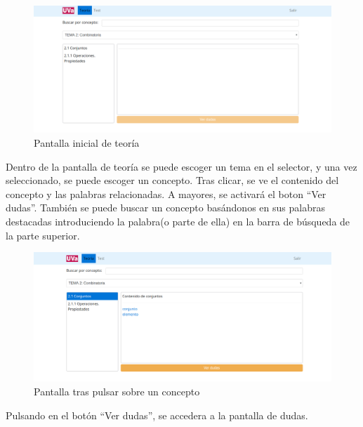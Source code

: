 \documentclass[openright,twoside,10pt]{book}
\begin{document}
    \begin{figure}[H]
        \begin{center}
            \includegraphics[width=\textwidth]{img/manual/alumno-teoria.png}
        \end{center}
        \caption{Pantalla inicial de teoría}
    \end{figure}
    
    Dentro de la pantalla de teoría se puede escoger un tema en el selector,
    y una vez seleccionado, se puede escoger un concepto. Tras clicar, se ve
    el contenido del concepto y las palabras relacionadas. A mayores, se
    activará el boton \enquote{Ver dudas}. También se puede buscar un
    concepto basándonos en sus palabras destacadas introduciendo la
    palabra(o parte de ella) en la barra de búsqueda de la parte superior.
    
    \begin{figure}[H]
        \begin{center}
            \includegraphics[width=\textwidth]{img/manual/alumno-teoria2.png}
        \end{center}
        \caption{Pantalla tras pulsar sobre un concepto}
    \end{figure}
    
    Pulsando en el botón \enquote{Ver dudas}, se accedera a la pantalla de
    dudas.
    
\end{document}
